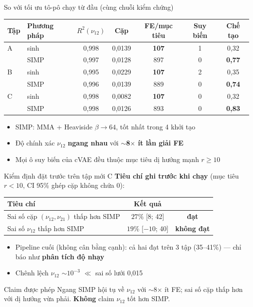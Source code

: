 \documentclass[aspectratio=169,11pt]{beamer}
\newcommand{\nuot}{\nu_{12}}
\newcommand{\nuto}{\nu_{21}}
\newcommand{\RR}{R^2}
\newcommand{\pass}{\textcolor{green!50!black}{\textbf{đạt}}}
\newcommand{\fail}{\textcolor{red!70!black}{\textbf{không đạt}}}
\begin{document}
\begin{frame}{So với tối ưu tô-pô chạy từ đầu (cùng chuỗi kiểm chứng)}
  \centering
  \small
  \begin{tabular}{llccccc}
    \toprule
    Tập & Phương pháp & $\RR(\nuot)$ & Cặp & FE/mục tiêu & Suy biến & Chế tạo\\
    \midrule
    A & sinh & 0,998 & 0,0139 & \textbf{107} & 1 & 0,32\\
      & SIMP & 0,997 & 0,0128 & 897 & 0 & \textbf{0,77}\\
    B & sinh & 0,995 & 0,0229 & \textbf{107} & 2 & 0,35\\
      & SIMP & 0,996 & 0,0139 & 889 & 0 & \textbf{0,74}\\
    C & sinh & 0,998 & 0,0082 & \textbf{107} & 0 & 0,32\\
      & SIMP & 0,998 & 0,0126 & 893 & 0 & \textbf{0,83}\\
    \bottomrule
  \end{tabular}
  \vspace{4mm}
  \begin{itemize}
    \item SIMP: MMA + Heaviside $\beta\to64$, tốt nhất trong 4 khởi tạo
    \item Độ chính xác $\nuot$ \textbf{ngang nhau} với \textbf{$\sim$8$\times$
      ít lần giải FE}
    \item Mọi ô suy biến của cVAE đều thuộc mục tiêu dị hướng mạnh $r\ge10$
  \end{itemize}
\end{frame}

\begin{frame}{Kiểm định đặt trước trên tập mới C}
  \textbf{Tiêu chí ghi trước khi chạy} (mục tiêu $r<10$, CI 95\% ghép cặp
  không chứa 0):
  \vspace{2mm}
  \begin{center}
  \begin{tabular}{lcc}
    \toprule
    Tiêu chí & Kết quả & \\
    \midrule
    Sai số cặp $(\nuot,\nuto)$ thấp hơn SIMP & $27\%$ [8; 42] & \pass\\
    Sai số $\nuot$ thấp hơn SIMP & $19\%$ [$-10$; 40] & \fail\\
    \bottomrule
  \end{tabular}
  \end{center}
  \vspace{2mm}
  \begin{itemize}
    \item Pipeline cuối (không cân bằng cạnh): cả hai đạt trên 3 tập
      (35--41\%) --- chỉ báo như \textbf{phân tích độ nhạy}
    \item Chênh lệch $\nuot$ $\sim\!10^{-3}$ $\ll$ sai số lưới 0,015
  \end{itemize}
  \begin{block}{Claim được phép}
    Ngang SIMP hội tụ về $\nuot$ với $\sim$8$\times$ ít FE; sai số cặp thấp
    hơn với dị hướng vừa phải. \textbf{Không} claim $\nuot$ tốt hơn SIMP.
  \end{block}
\end{frame}
\end{document}

